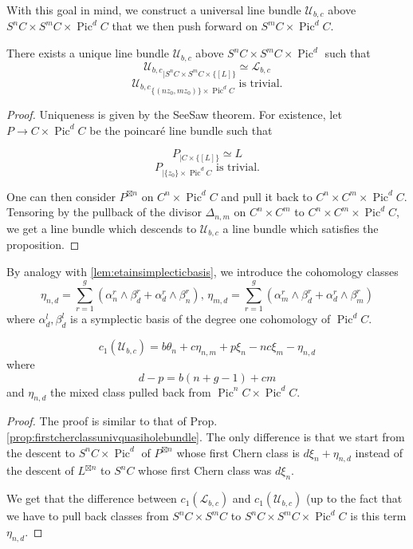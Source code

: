 \documentclass{article}
\theoremstyle{definition}
\DeclareMathOperator{\pic}{\text{Pic}}
\begin{document}
With this goal in mind, we construct a universal line bundle $\mathcal{U}_{b,c}$ above $S^n C \times S^m C \times \pic^d C$ that we then push forward on $S^m C \times \pic^d C$.

\begin{proposition}
There exists a unique line bundle $\mathcal{U}_{b,c}$ above $S^n C \times S^m C \times \pic^d$ such that
$${\mathcal{U}_{b,c}}_{|S^n C \times S^m C \times \{[L]\} } \simeq \mathcal{L}_{b,c}$$
$${\mathcal{U}_{b,c}}_{ \{(n z_0,m z_0)\} \times \pic^d C} \text{ is trivial.}$$
    
    
\end{proposition}

\begin{proof}
Uniqueness is given by the SeeSaw theorem. For existence, let $P\to C \times \pic^d C$ be the poincaré line bundle such that 

$$P_{|C\times \{[L]\}}\simeq L$$
$$P_{|\{z_0\}\times \pic^d C} \text{ is trivial.}$$

One can then consider $P^{\boxtimes n}$ on $C^n\times \pic^d C$ and pull it back to $C^n \times C^m \times \pic^d C$. Tensoring by the pullback of the divisor $\Delta_{n,m}$ on $C^n \times C^m$ to $C^n \times C^m \times \pic^d C$, we get a line bundle which descends to $\mathcal{U}_{b,c}$ a line bundle which satisfies the proposition.

\end{proof}

By analogy with \ref{lem:etainsimplecticbasis}, we introduce the cohomology classes
$$\eta_{n,d}=\sum_{r=1}^g (\alpha_n^r \wedge\beta_d^r +\alpha_d^r \wedge\beta_n^r), \, \eta_{m,d}=\sum_{r=1}^g (\alpha_m^r \wedge\beta_d^r +\alpha_d^r \wedge\beta_m^r)$$
where $\alpha_d^l,\beta_d^l$ is a symplectic basis of the degree one cohomology of $\pic^d C$.

\begin{proposition}
    $$c_1(\mathcal{U}_{b,c})=b\theta_n + c \eta_{n,m} + p \xi_n -n c \xi_m - \eta_{n,d}$$
    where $$d-p=b(n+g-1)+cm$$ and $\eta_{n,d}$ the mixed class pulled back from $\pic^nC \times \pic^d C$. 
\end{proposition}

\begin{proof}
The proof is similar to that of Prop. \ref{prop:firstcherclassunivquasiholebundle}. The only difference is that we start from the descent to $S^n C \times \pic^{d}$ of $P^{\boxtimes n}$ whose first Chern class is $d\xi_n +\eta_{n,d}$ instead of the descent of $L^{\boxtimes n}$ to $S^n C$ whose first Chern class was $d \xi_n$.

We get that the difference between $c_1(\mathcal{L}_{b,c})$ and $c_1(\mathcal{U}_{b,c})$ (up to the fact that we have to pull back classes from $S^n C\times S^m C$ to $S^n C \times S^m C \times \pic^d C$ is this term $\eta_{n,d}$.
\end{proof}
\end{document}

